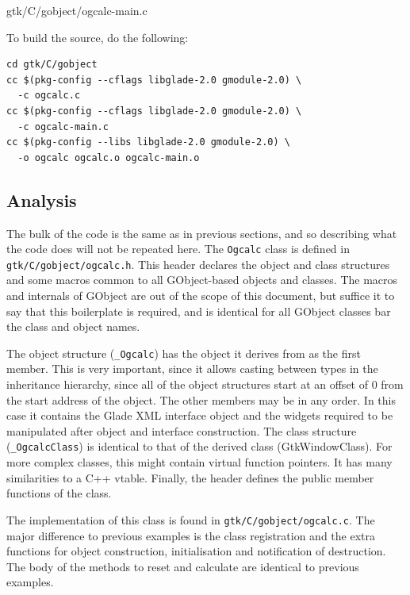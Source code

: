 \documentclass[a4paper,oneside]{article}
\newcommand{\filename}[1]{\texttt{#1}}
\newcommand{\class}[1]{\texttt{#1}}
\begin{document}

                 {gtk/C/gobject/ogcalc-main.c}

To build the source, do the following:

\begin{verbatim}
cd gtk/C/gobject
cc $(pkg-config --cflags libglade-2.0 gmodule-2.0) \
  -c ogcalc.c
cc $(pkg-config --cflags libglade-2.0 gmodule-2.0) \
  -c ogcalc-main.c
cc $(pkg-config --libs libglade-2.0 gmodule-2.0) \
  -o ogcalc ogcalc.o ogcalc-main.o
\end{verbatim}

\subsection{Analysis}

The bulk of the code is the same as in previous sections, and so
describing what the code does will not be repeated here.  The
\class{Ogcalc} class is defined in \filename{gtk/C/gobject/ogcalc.h}.
This header declares the object and class structures and some macros
common to all GObject-based objects and classes.  The macros and
internals of GObject are out of the scope of this document, but
suffice it to say that this boilerplate is required, and is identical
for all GObject classes bar the class and object names.

The object structure (\class{\_Ogcalc}) has the object it derives from
as the first member.  This is very important, since it allows casting
between types in the inheritance hierarchy, since all of the object
structures start at an offset of 0 from the start address of the
object.  The other members may be in any order.  In this case it
contains the Glade XML interface object and the widgets required to be
manipulated after object and interface construction.  The class
structure (\class{\_OgcalcClass}) is identical to that of the derived
class (GtkWindowClass).  For more complex classes, this might contain
virtual function pointers.  It has many similarities to a C++ vtable.
Finally, the header defines the public member functions of the class.

The implementation of this class is found in
\filename{gtk/C/gobject/ogcalc.c}.  The major difference to previous
examples is the class registration and the extra functions for object
construction, initialisation and notification of destruction.  The
body of the methods to reset and calculate are identical to previous
examples.
\end{document}

